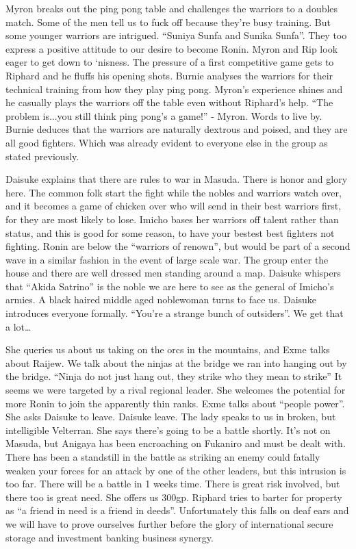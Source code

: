 Myron breaks out the ping pong table and challenges the warriors to a doubles match. Some of the men tell us to fuck off because they’re busy training. But some younger warriors are intrigued. “Suniya Sunfa and Sunika Sunfa”. They too express a positive attitude to our desire to become Ronin. Myron and Rip look eager to get down to ‘nisness. The pressure of a first competitive game gets to Riphard and he fluffs his opening shots. Burnie analyses the warriors for their technical training from how they play ping pong. Myron’s experience shines and he casually plays the warriors off the table even without Riphard’s help. “The problem is...you still think ping pong’s a game!” - Myron. Words to live by. Burnie deduces that the warriors are naturally dextrous and poised, and they are all good fighters. Which was already evident to everyone else in the group as stated previously.\medskip

Daisuke explains that there are rules to war in Masuda. There is honor and glory here. The common folk start the fight while the nobles and warriors watch over, and it becomes a game of chicken over who will send in their best warriors first, for they are most likely to lose. Imicho bases her warriors off talent rather than status, and this is good for some reason, to have your bestest best fighters not fighting. Ronin are below the “warriors of renown”, but would be part of a second wave in a similar fashion in the event of large scale war. The group enter the house and there are well dressed men standing around a map. Daisuke whispers that “Akida Satrino” is the noble we are here to see as the general of Imicho’s armies. A black haired middle aged noblewoman turns to face us. Daisuke introduces everyone formally. “You’re a strange bunch of outsiders”. We get that a lot…\medskip

She queries us about us taking on the orcs in the mountains, and Exme talks about Raijew. We talk about the ninjas at the bridge we ran into hanging out by the bridge. “Ninja do not just hang out, they strike who they mean to strike” It seems we were targeted by a rival regional leader. She welcomes the potential for more Ronin to join the apparently thin ranks. Exme talks about “people power”. She asks Daisuke to leave. Daisuke leave. The lady speaks to us in broken, but intelligible Velterran. She says there’s going to be a battle shortly. It’s not on Masuda, but Anigaya has been encroaching on Fukaniro and must be dealt with. There has been a standstill in the battle as striking an enemy could fatally weaken your forces for an attack by one of the other leaders, but this intrusion is too far. There will be a battle in 1 weeks time. There is great risk involved, but there too is great need. She offers us 300gp. Riphard tries to barter for property as “a friend in need is a friend in deeds”. Unfortunately this falls on deaf ears and we will have to prove ourselves further before the glory of international secure storage and investment banking business synergy.\medskip

